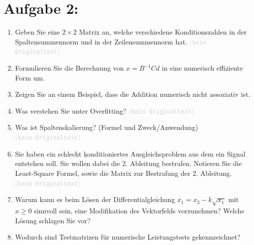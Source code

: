 \documentclass[12pt]{article}
\newcommand{\kommentarMacro}[1]{\textcolor{lightgray}{(\texttt{#1})}}
\begin{document}
\section*{Aufgabe 2:}
\begin{enumerate}
	\item Geben Sie eine $2\times2$ Matrix an, welche verschiedene Konditionszahlen in der Spaltensummennorm und in der Zeilensummennorm hat. \kommentarMacro{kein Originaltext}

	      \vspace{1.25cm}

	\item Formulieren Sie die Berechnung von $x = B^{-1}Cd$ in eine numerisch effiziente Form um.

	      \vspace{1.25cm}

	\item Zeigen Sie an einem Beispiel, dass die Addition numerisch nicht assoziativ ist.

	      \vspace{1.25cm}

	\item Was verstehen Sie unter Overfitting? \kommentarMacro{kein Originaltext}

	      \vspace{1.25cm}

	\item Was ist Spaltenskalierung? (Formel und Zweck/Anwendung) \\ \kommentarMacro{kein Originaltext}

	      \vspace{1.25cm}

	\item Sie haben ein schlecht konditioniertes Ausgleichsproblem aus dem ein Signal entstehen soll. Sie wollen dabei die 2. Ableitung bestrafen. Notieren Sie die Least-Square Formel, sowie die Matrix zur Bestrafung der 2. Ableitung. \\ \kommentarMacro{kein Originaltext}

	      \vspace{1.25cm}

	\item Warum kann es beim Lösen der Differentialgleichung $\dot{x_1} = x_2 - k \sqrt{x_1}$ mit \mbox{$x\geq 0$} sinnvoll sein, eine Modifikation des Vektorfelds vorzunehmen? Welche Lösung schlagen Sie vor?

	      \vspace{1.25cm}

	\item Wodurch sind Testmatrizen für numerische Leistungstests gekennzeichnet?

\end{enumerate}
\pagebreak
\end{document}
